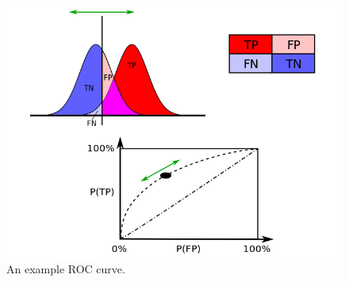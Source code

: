 \documentclass[a4paper, 12pt]{report}
\theoremstyle{definition}
\begin{document}
\begin{figure}[h!]
    \centering
    \includegraphics[scale=0.34]{im/ROCcurves.png}
    \caption{An example ROC curve.}
    \label{fig:rocex}
\end{figure}
\end{document}
